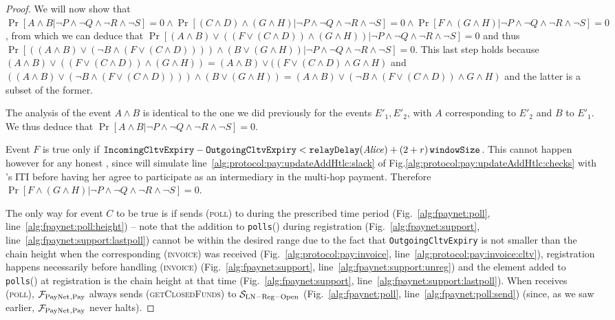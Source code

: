 \begin{proof}
  We will now show that $\Pr[A \wedge B | \neg P \wedge \neg Q \wedge \neg R
  \wedge \neg S] = 0 \wedge \Pr[(C \wedge D) \wedge (G \wedge H) | \neg P \wedge
  \neg Q \wedge \neg R \wedge \neg S] = 0 \wedge \Pr[F \wedge (G \wedge H) |
  \neg P \wedge \neg Q \wedge \neg R \wedge \neg S] = 0$, from which we can
  deduce that $\Pr[(A \wedge B) \vee ((F \vee (C \wedge D)) \wedge (G \wedge H))
  | \neg P \wedge \neg Q \wedge \neg R \wedge \neg S] = 0$ and thus $\Pr[((A
  \wedge B) \vee (\neg B \wedge (F \vee (C \wedge D)))) \wedge (B \vee (G \wedge
  H)) | \neg P \wedge \neg Q \wedge \neg R \wedge \neg S] = 0$. This last step
  holds because $(A \wedge B) \vee ((F \vee (C \wedge D)) \wedge (G \wedge H)) =
  (A \wedge B) \vee ((F \vee (C \wedge D) \wedge G \wedge H)$ and $((A \wedge B)
  \vee (\neg B \wedge (F \vee (C \wedge D)))) \wedge (B \vee (G \wedge H)) = (A
  \wedge B) \vee (\neg B \wedge (F \vee (C \wedge D)) \wedge G \wedge H)$ and
  the latter is a subset of the former.

  The analysis of the event $A \wedge B$ is identical to the one we did
  previously for the events $E'_1, E'_2$, with $A$ corresponding to $E'_2$ and
  $B$ to $E'_1$. We thus deduce that $\Pr[A \wedge B | \neg P \wedge \neg Q
  \wedge \neg R \wedge \neg S] = 0$.

  Event $F$ is true only if $\mathtt{IncomingCltvExpiry} -
  \mathtt{OutgoingCltvExpiry} < \mathtt{relayDelay}(\mathit{Alice}) + \left(2 + r\right)\texttt{windowSize}$. This
  cannot happen however for any honest \alice, since \simulator{} will simulate
  line~\ref{alg:protocol:pay:updateAddHtlc:slack} of
  Fig.\ref{alg:protocol:pay:updateAddHtlc:checks} with \alice's ITI before
  having her agree to participate as an intermediary in the multi-hop payment.
  Therefore $\Pr[F \wedge (G \wedge H) | \neg P \wedge \neg Q \wedge \neg R
  \wedge \neg S] = 0$.

  The only way for event $C$ to be true is if \environment{} sends
  (\textsc{poll}) to \dave{} during the prescribed time period
  (Fig.~\ref{alg:fpaynet:poll}, line~\ref{alg:fpaynet:poll:height}) -- note that
  the addition to \texttt{polls}(\dave) during registration
  (Fig.~\ref{alg:fpaynet:support}, line~\ref{alg:fpaynet:support:lastpoll})
  cannot be within the desired range due to the fact that
  \texttt{OutgoingCltvExpiry} is not smaller than the chain height when the
  corresponding (\textsc{invoice}) was received
  (Fig.~\ref{alg:protocol:pay:invoice},
  line~\ref{alg:protocol:pay:invoice:cltv}), registration happens necessarily
  before handling (\textsc{invoice}) (Fig.~\ref{alg:fpaynet:support},
  line~\ref{alg:fpaynet:support:unreg}) and the element added to
  \texttt{polls}(\dave) at registration is the chain height at that time
  (Fig.~\ref{alg:fpaynet:support}, line~\ref{alg:fpaynet:support:lastpoll}).
  When \dave{} receives (\textsc{poll}), $\mathcal{F}_{\mathrm{PayNet}}{}_{\mathrm{, Pay}}$ always
  sends (\textsc{getClosedFunds}) to $\mathcal{S}_{\mathrm{LN - Reg - Open}}$
  (Fig.~\ref{alg:fpaynet:poll}, line~\ref{alg:fpaynet:poll:send}) (since, as we
  saw earlier, $\mathcal{F}_{\mathrm{PayNet}}{}_{\mathrm{, Pay}}$ never halts).


\end{proof}
